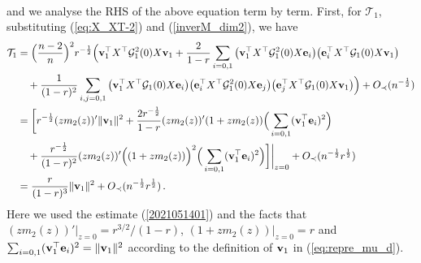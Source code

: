 \documentclass[12pt]{article}
\numberwithin{equation}{section}
\theoremstyle{remark}
\newcommand{\1}{{\rm 1}\kern-0.24em{\rm I}}
\begin{document}
\begin{appendices}
\begin{align}
\end{align}
and we analyse  the RHS of the above equation term by term. First, for $\mathcal{T}_1$, substituting (\ref{eq:X_XT-2}) and (\ref{inverM_dim2}), we have 
\begin{align} \label{20201230002}
\mathcal{T}_1 &= \Big(\frac{n-2}{n}\Big)^2 r^{-\frac 12}\Big( {\bf v}_1^{\top} {X}^{\top} \mathcal{G}_1^2(0){X}{\bf v}_1 + \frac {2}{1-r}\sum_{i=0,1} \big({\bf v}_1^{\top} {X}^{\top} \mathcal{G}_1^2(0){X}{\bf e}_i \big)\big({\bf e}_i^{\top} {X}^{\top} \mathcal{G}_1(0){X}{\bf v}_1\big) \notag\\
&\quad + \frac{1}{(1-r)^2} \sum_{i,j=0,1} \big({\bf v}_1^{\top} {X}^{\top} \mathcal{G}_1(0){X}{\bf e}_i \big) \big({\bf e}_i^{\top} {X}^{\top} \mathcal{G}_1^2(0){X}{\bf e}_j\big)
\big({\bf e}_j^{\top} {X}^{\top} \mathcal{G}_1(0){X}{\bf v}_1\big)\Big) + O_\prec(n^{-\frac 12}) \notag\\
&=\bigg[r^{-\frac 12} (zm_2(z))' \Vert {\bf v}_1\Vert^2 + \frac{2r^{-\frac 12}}{1-r} (zm_2(z))' (1+zm_2(z))\Big( \sum_{i=0,1}({\bf v}_1^{\top} {\bf e}_i)^2\Big)  \notag\\
&\quad + \frac{r^{-\frac 12}}{(1-r)^2} (zm_2(z))'\Big( (1+ zm_2(z))\Big)^2 \Big( \sum_{i=0,1}({\bf v}_1^{\top} {\bf e}_i)^2\Big)\bigg]\bigg|_{z=0}+ O_\prec(n^{-\frac 12}r^{\frac 12}) \notag\\
&= \frac{r}{(1-r)^3}\Vert {\bf v}_1\Vert^2 +  O_\prec(n^{-\frac 12}r^{\frac 12})\,. 
\end{align}
Here we used the estimate (\ref{2021051401}) and the facts that $(zm_2(z))'\big|_{z=0} = r^{3/2}/(1-r) $, $(1+ zm_2(z))\big|_{z=0}= r$ and $\sum_{i=0,1}({\bf v}_1^{\top} {\bf e}_i)^2= \Vert{\bf v}_1\Vert^2$ according to the definition of ${\bf v}_1$ in (\ref{eq:repre_mu_d}). 


\end{appendices}
\end{document}
